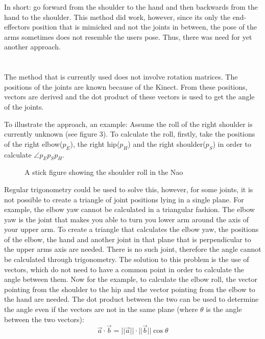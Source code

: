 \documentclass[letterpaper, 10pt, conference]{ieeeconf}
\begin{document}
In short: go forward from the shoulder to the hand and then backwards from the hand to the shoulder.
This method did work, however, since its only the end-effectors position that is mimicked and not the joints in between, the pose of the arms sometimes does not resemble the users pose. Thus, there was need for yet another approach.\\\\
\\
The method that is currently used does not involve rotation matrices. The positions of the joints are known because of the Kinect. From these positions, vectors are derived and the dot product of these vectors is used to get the angle of the joints. 

To illustrate the approach, an example: Assume the roll of the right shoulder is currently unknown (see figure 3). To calculate the roll, firstly, take the positions of the right elbow($p_{E}$), the right hip($p_{H}$) and the right shoulder($p_{S}$) in order to calculate $\angle p_{E}p_{S}p_{H}$.
\begin{figure}
\label{ShoulderRoll}
\caption{A stick figure showing the shoulder roll in the Nao}
\end{figure}
Regular trigonometry could be used to solve this, however, for some joints, it is not possible to create a triangle of joint positions lying in a single plane.  For example, the elbow yaw cannot be calculated in a triangular fashion. The elbow yaw is the joint that makes you able to turn you lower arm around the axis of your upper arm. To create a triangle that calculates the elbow yaw, the positions of the elbow, the hand and another joint in that plane that is perpendicular to the upper arms axis are needed. There is no such joint, therefore the angle cannot be calculated through trigonometry. The solution to this problem is the use of vectors, which do not need to have a common point in order to calculate the angle between them. Now for the example, to calculate the elbow roll, the vector pointing from the shoulder to the hip and the vector pointing from the elbow to the hand are needed. The dot product between the two can be used to determine the angle even if the vectors are not in the same plane (where $\theta$ is the angle between the two vectors):
$$ \vec{a} \cdot \vec{b} = ||\vec{a}|| \cdot ||\vec{b}|| \cos{\theta}$$
\end{document}
